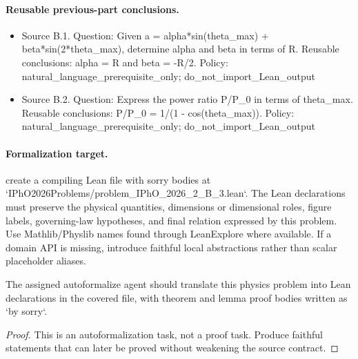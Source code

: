 \paragraph{Reusable previous-part conclusions.}
\begin{itemize}
\item Source B.1. Question: Given a = alpha*sin(theta\_max) + beta*sin(2*theta\_max), determine alpha and beta in terms of R. Reusable conclusions: alpha = R and beta = -R/2. Policy: natural\_language\_prerequisite\_only; do\_not\_import\_Lean\_output
\item Source B.2. Question: Express the power ratio P/P\_0 in terms of theta\_max. Reusable conclusions: P/P\_0 = 1/(1 - cos(theta\_max)). Policy: natural\_language\_prerequisite\_only; do\_not\_import\_Lean\_output
\end{itemize}

\paragraph{Formalization target.}
create a compiling Lean file with sorry bodies at `IPhO2026Problems/problem\_IPhO\_2026\_2\_B\_3.lean`.
The Lean declarations must preserve the physical quantities, dimensions or dimensional roles, figure labels, governing-law hypotheses, and final relation expressed by this problem.
Use Mathlib/Physlib names found through LeanExplore where available. If a domain API is missing, introduce faithful local abstractions rather than scalar placeholder aliases.

\begin{theorem}
\label{thm:physics:IPhO_2026_2_B_3:target}
The assigned autoformalize agent should translate this physics problem into Lean declarations in the covered file, with theorem and lemma proof bodies written as `by sorry`.
\end{theorem}
\begin{proof}
This is an autoformalization task, not a proof task. Produce faithful statements that can later be proved without weakening the source contract.
\end{proof}

